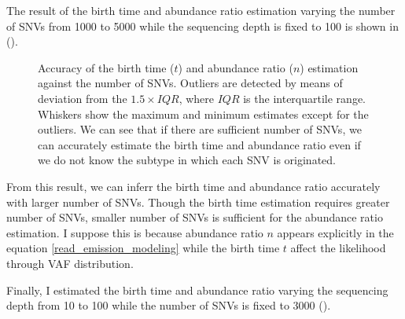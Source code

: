 \documentclass{article}
\begin{document}
The result of the birth time and abundance ratio estimation varying the number of SNVs from 1000 to 5000 while the sequencing depth is fixed to 100 is shown in ().

\begin{figure}[H]
   \caption{
 Accuracy of the birth time ($t$) and abundance ratio ($n$) estimation against the number of SNVs. Outliers are detected by means of deviation from the $1.5 \times IQR$, where $IQR$ is the interquartile range. Whiskers show the maximum and minimum estimates except for the outliers. We can see that if there are sufficient number of SNVs, we can accurately estimate the birth time and abundance ratio even if we do not know the subtype in which each SNV is originated.
  }
 \label{fig: read_emission_snv}
\end{figure}

From this result, we can inferr the birth time and abundance ratio accurately with larger number of SNVs.
Though the birth time estimation requires greater number of SNVs, smaller number of SNVs is sufficient for the abundance ratio estimation.
I suppose this is because abundance ratio $n$ appears explicitly in the equation \eqref{read_emission_modeling} while the birth time $t$ affect the likelihood through VAF distribution.

Finally, I estimated the birth time and abundance ratio varying the sequencing depth from 10 to 100 while the number of SNVs is fixed to 3000 ().
\end{document}
